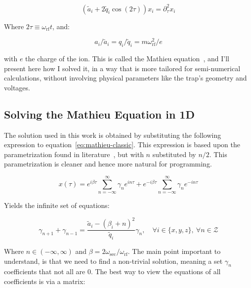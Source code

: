 \begin{equation}
    (\tilde{a}_i + 2 \tilde{q}_i \cos(2 \tau)) x_i = \partial_\tau^2{x}_i
    \label{eq:mathieu-classic}
\end{equation}

Where $2\tau \equiv \omega_\mathrm{rf} t$, and:

\begin{equation}
a_i/\tilde{a}_i = q_i/\tilde{q}_i = m \omega_\mathrm{rf}^2/e
\label{eq:aq_tilde_relation}
\end{equation}

with $e$ the charge of the ion. This is called the Mathieu equation~\cite{MathieuOriginal}, and I'll present here how I solved it, in a way that is more tailored for semi-numerical calculations, without involving physical parameters like the trap's geometry and voltages.

\subsection{Solving the Mathieu Equation in 1D}

The solution used in this work is obtained by substituting the following expression to equation~\ref{eq:mathieu-classic}. This expression is based upon the parametrization found in literature~\cite{ionTrapBook,MathieuEquationStandardParams}, but with $n$ substituted by $n/2$. This parametrization is cleaner and hence more natural for programming.

\begin{equation}
x(\tau) = e^{i\beta\tau}\sum_{n=-\infty}^\infty \gamma_n e^{i n \tau} + e^{-i\beta\tau}\sum_{n=-\infty}^\infty \gamma_n e^{-i n \tau}
\end{equation}

Yields the infinite set of equations:

\begin{equation}
    \gamma_{n+1} + \gamma_{n-1} = \frac{\tilde{a}_i - \left(\beta_i + n\right)^2}{\tilde{q}_i} \gamma_n,\quad \forall i\in\{x,y,z\},\ \forall n\in\mathcal{Z}
    \label{eq:gamma_n-relation}
\end{equation}

Where $n\in(-\infty, \infty)$ and $\beta = 2 \omega_\mathrm{sec}/\omega_\mathrm{rf}$. The main point important to understand, is that we need to find a non-trivial solution, meaning a set $\gamma_n$ coefficients that not all are $0$. The best way to view the equations of all coefficients is via a matrix:

